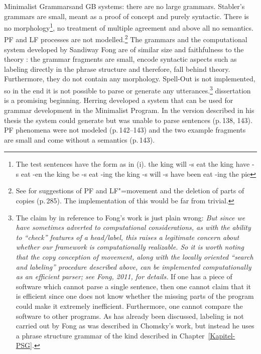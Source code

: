 Minimalist Grammars\indexmg and GB systems: there are no large grammars. Stabler's grammars are small, meant as a proof of concept and purely
syntactic. There is no morphology\footnote{%
	The test sentences have the form as in (i).
\eal
\ex the king will -s eat
\ex the king have -s eat -en
\ex the king be -s eat -ing
\ex the king -s will -s have been eat -ing the pie\vspace{-\baselineskip}%
\zllast%
}, no treatment of multiple agreement \citep[Section~27.4.3]{Stabler2010b} and above all no semantics. PF and LF
processes are not modelled.\footnote{%
	See \citet{SE2002a} for suggestions of PF and LF"=movement and the deletion of parts of copies (p.\,285).
	The implementation of this would be far from trivial.
} 
The grammars and the computational system developed by Sandiway Fong are of similar size and faithfulness
to the theory \citep{FG2012a,Fong2014a}: the grammar fragments are small,
encode syntactic aspects such as labeling directly in the phrase structure \citep[Section~4]{FG2012a} and therefore, fall behind \xbar theory.
Furthermore, they do not contain any morphology. Spell-Out is not implemented, so in the end it is not possible to parse or generate any 
utterances.\footnote{%
	The claim by \citet*[]{BPYC2011a} in reference to Fong's work is just plain wrong: \emph{But since we have
    sometimes adverted to computational considerations, as with the ability to ``check'' features of
    a head/label, this raises a legitimate concern about whether our framework is computationally
    realizable. So it is worth noting that the copy conception of movement, along with the locally
    oriented ``search and labeling'' procedure described above, can be implemented computationally
    as an efficient parser; see Fong, 2011, for details.} If one has a piece of software which cannot
	parse a single sentence, then one cannot claim that it is efficient since one does not know whether the 
	missing parts of the
	program could make it extremely inefficient. Furthermore, one cannot compare the software to other programs.
	As has already been discussed, labeling is not carried out by Fong as was described in
        Chomsky's work, but instead he uses a phrase structure grammar  of the kind described in Chapter~\ref{Kapitel-PSG}.%
}
 dissertation is a promising beginning. Herring developed a system that can be used for grammar development in the Minimalist
Program. In the version described in his thesis the system could generate but was unable to parse
sentences (p.\,138, 143). PF phenomena were not modeled (p.\,142--143) and the two example fragments
are small and come without a semantics (p.\,143).

